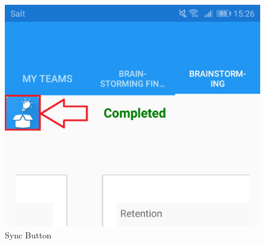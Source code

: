 \begin{figure}
	\centering
	\includegraphics[width=0.35\linewidth]{img/techn-bericht/sync-workaround}
	\caption{Sync Button}
	\label{fig:sync-workaround}
\end{figure}

